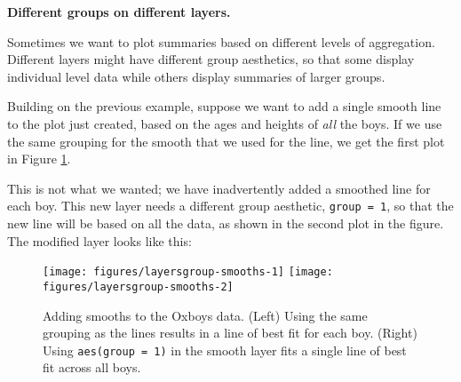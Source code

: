 \textbf{Different groups on different layers.}

Sometimes we want to plot summaries based on different levels of
aggregation. Different layers might have different group aesthetics, so
that some display individual level data while others display summaries
of larger groups.

Building on the previous example, suppose we want to add a single smooth
line to the plot just created, based on the ages and heights of
\emph{all} the boys. If we use the same grouping for the smooth that we
used for the line, we get the first plot in Figure
\ref{fig:group-smooths}. 

\begin{Shaded}
\begin{Highlighting}[]
\StringTok{ }\NormalTok{(}\NormalTok{(} \NormalTok{, } 
\end{Highlighting}
\end{Shaded}

This is not what we wanted; we have inadvertently added a smoothed line
for each boy. This new layer needs a different group aesthetic,
\texttt{group = 1}, so that the new line will be based on all the data,
as shown in the second plot in the figure. The modified layer looks like
this:

\begin{Shaded}
\begin{Highlighting}[]
\StringTok{ }\NormalTok{(}\NormalTok{(} \NormalTok{), }\NormalTok{, } \NormalTok{, } 
\end{Highlighting}
\end{Shaded}

\begin{figure}

{\centering \texttt{[image: figures/layersgroup-smooths-1]} \texttt{[image: figures/layersgroup-smooths-2]} 

}

\caption{Adding smooths to the Oxboys data.  (Left) Using the same grouping as the lines results in a line of best fit for each boy.  (Right) Using \texttt{aes(group = 1)} in the smooth layer fits a single line of best fit across all boys.\label{fig:group-smooths}}
\end{figure}

